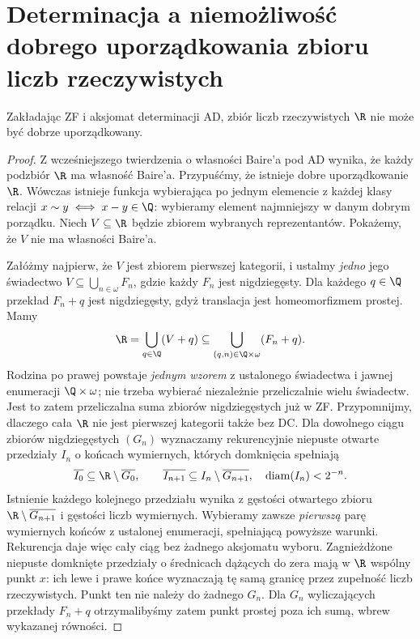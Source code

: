 \section{Determinacja a niemożliwość dobrego uporządkowania zbioru liczb rzeczywistych}
\label{sec:ad-no-wellorder-reals}
\begin{twierdzenie}[ZF+AD]
\label{thm:ad-no-wellorder-reals}
Zakładając ZF i aksjomat determinacji AD, zbiór liczb
rzeczywistych $\R$ nie może być dobrze uporządkowany.
\end{twierdzenie}
\begin{proof}
Z wcześniejszego twierdzenia o własności Baire'a pod AD
wynika, że każdy podzbiór $\R$ ma własność Baire'a.
Przypuśćmy, że istnieje dobre uporządkowanie $\R$.
Wówczas istnieje funkcja wybierająca po jednym elemencie
z każdej klasy relacji $x\sim y\iff x-y\in\Q$:
wybieramy element najmniejszy w danym dobrym porządku.
Niech $V\subseteq\R$ będzie zbiorem wybranych reprezentantów.
Pokażemy, że $V$ nie ma własności Baire'a.

Załóżmy najpierw, że $V$ jest zbiorem
pierwszej kategorii, i ustalmy \emph{jedno}
jego świadectwo
$V\subseteq\bigcup_{n\in\omega}F_n$,
gdzie każdy $F_n$ jest nigdziegęsty.
Dla każdego $q\in\Q$ przekład $F_n+q$
jest nigdziegęsty, gdyż translacja
jest homeomorfizmem prostej.
Mamy
\[
\R=\bigcup_{q\in\Q}(V+q)
\subseteq\bigcup_{(q,n)\in\Q\times\omega}(F_n+q).
\]
Rodzina po prawej powstaje
\emph{jednym wzorem} z ustalonego świadectwa
i jawnej enumeracji $\Q\times\omega$;
nie trzeba wybierać niezależnie
przeliczalnie wielu świadectw.
Jest to zatem przeliczalna suma
zbiorów nigdziegęstych już w ZF.
Przypomnijmy, dlaczego cała $\R$
nie jest pierwszej kategorii także bez DC.
Dla dowolnego ciągu zbiorów
nigdziegęstych $(G_n)$
wyznaczamy rekurencyjnie
niepuste otwarte przedziały $I_n$
o końcach wymiernych,
których domknięcia spełniają
\[
\overline{I_0}\subseteq
          \R\setminus\overline{G_0},
\qquad
\overline{I_{n+1}}
 \subseteq I_n\setminus\overline{G_{n+1}},
\quad
\operatorname{diam}(I_n)<2^{-n}.
\]
Istnienie każdego kolejnego
przedziału wynika z gęstości
otwartego zbioru
$\R\setminus\overline{G_{n+1}}$
i gęstości liczb wymiernych.
Wybieramy zawsze \emph{pierwszą}
parę wymiernych końców
z ustalonej enumeracji,
spełniającą powyższe warunki.
Rekurencja daje więc cały ciąg
bez żadnego aksjomatu wyboru.
Zagnieżdżone niepuste domknięte
przedziały o średnicach dążących do zera
mają w $\R$ wspólny punkt $x$:
ich lewe i prawe końce wyznaczają
tę samą granicę przez zupełność liczb
rzeczywistych. Punkt ten nie należy
do żadnego $G_n$.
Dla $G_n$ wyliczających przekłady
$F_n+q$ otrzymalibyśmy zatem
punkt prostej poza ich sumą,
wbrew wykazanej równości.


\end{proof}
